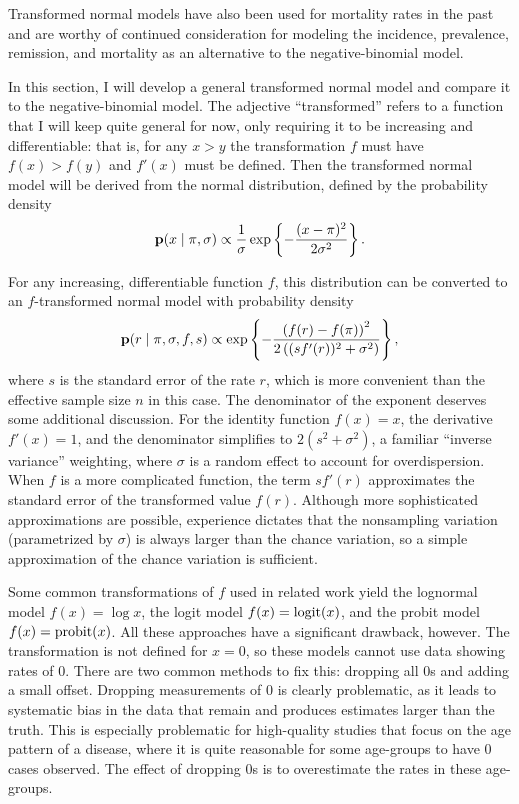 Transformed normal models have also been used for mortality rates in
the
past\cite{girosi_demographic_2008,hogan_maternal_2010,rajaratnam_neonatal_2010}
and are worthy of continued consideration for modeling the incidence,
prevalence, remission, and mortality as an alternative to the
negative-binomial model.

In this section, I will develop a general transformed normal model
and compare it to the negative-binomial model.  The adjective
``transformed'' refers to a function that I will keep quite general
for now, only requiring it to be increasing and differentiable:
that is, for any $x > y$ the transformation $f$ must have $f(x) > f(y)$
and $f'(x)$ must be defined.  Then the transformed normal model will
be derived from the normal distribution, defined by the probability
density
\[
\mathbf{p}(x\;|\; \pi, \sigma)
 \propto \frac{1}{\sigma}
\exp\left\{ -\frac{(x-\pi)^2}{2\sigma^2} \right\}.
\]

For any increasing, differentiable function $f$, this distribution can
be converted to an $f$-transformed normal model with probability
density
\[
\mathbf{p}(r \;|\; \pi, \sigma, f, s) \propto
\exp\left\{-\frac{\left(f(r)-f(\pi)\right)^2}{2\left((sf'(r))^2+\sigma^2\right)}\right\},
\]
where $s$ is the standard error of the rate $r$, which is more
convenient than the effective sample size $n$ in this case. The
denominator of the exponent deserves some additional discussion.  For
the identity function $f(x) = x$, the derivative $f'(x) = 1$, and the
denominator simplifies to $2(s^2 + \sigma^2)$, a familiar ``inverse
variance'' weighting, where $\sigma$ is a random effect to account for
overdispersion.  When $f$ is a more complicated function, the term
$sf'(r)$ approximates the standard error of the transformed value
$f(r)$.  Although more sophisticated approximations are possible,
experience dictates that the nonsampling variation (parametrized by
$\sigma$) is always larger than the chance variation, so a simple
approximation of the chance variation is sufficient.

Some common transformations of $f$ used in related work yield the
lognormal model $f(x) = \log x$, the logit model $f(x) = \operatorname{logit}(x)$,
and the probit model $f(x) = \operatorname{probit}(x)$.  All these approaches
have a significant drawback, however.  The transformation is not
defined for $x=0$, so these models cannot use data showing rates of
$0$. There are two common methods to fix this: dropping all $0$s
and adding a small offset.  Dropping measurements of $0$ is clearly
problematic, as it leads to systematic bias in the data that remain
and produces estimates larger than the truth.  This is especially
problematic for high-quality studies that focus on the age pattern of
a disease, where it is quite reasonable for some age-groups to have
$0$ cases observed.  The effect of dropping $0$s is to overestimate
the rates in these age-groups.

